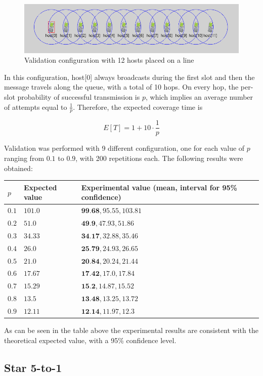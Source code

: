 \begin{figure}[H]
    \begin{center}
        \includegraphics[scale=0.75]{img/singleQueueGUI.png}
        \caption{Validation configuration with 12 hosts placed on a line}
        \label{fig:single_queueGUI}
    \end{center}
    \vspace*{-0.8cm}
\end{figure}

In this configuration, host[0] always broadcasts during the first slot and then the message travels along the queue, with a total of 10 hops. On every hop, the per-slot probability of successful transmission is $p$, which implies an average number of attempts equal to $\frac{1}{p}$. Therefore, the expected coverage time is

\begin{equation}
    E[T] = 1 + 10 \cdot \frac{1}{p}
    \label{eq:singleQueueValidationAvgT}
\end{equation}

Validation was performed with 9 different configuration, one for  each value of $p$ ranging from $0.1$ to $0.9$, with 200 repetitions each.
The following results were obtained:

\begin{center}
\begin{tabular}{ | m{1cm} | m{5cm}| m{5cm} | }
\hline
$p$& Expected value & Experimental value (mean, interval for 95\% confidence)\\
\hline
$0.1$&$101.0$&$\textbf{99.68}, 95.55, 103.81$\\
\hline
$0.2$&$51.0$&$\textbf{49.9}, 47.93, 51.86$\\
\hline
$0.3$&$34.33$&$\textbf{34.17}, 32.88, 35.46$\\
\hline
$0.4$&$26.0$&$\textbf{25.79}, 24.93, 26.65$\\
\hline
$0.5$&$21.0$&$\textbf{20.84}, 20.24, 21.44$\\
\hline
$0.6$&$17.67$&$\textbf{17.42}, 17.0, 17.84$\\
\hline
$0.7$&$15.29$&$\textbf{15.2}, 14.87, 15.52$\\
\hline
$0.8$&$13.5$&$\textbf{13.48}, 13.25, 13.72$\\
\hline
$0.9$&$12.11$&$\textbf{12.14}, 11.97, 12.3$\\
\hline
\end{tabular}
\end{center}

As can be seen in the table above %
the experimental results are consistent with the theoretical expected value, with a 95\% confidence level. %
\subsection{Star 5-to-1}